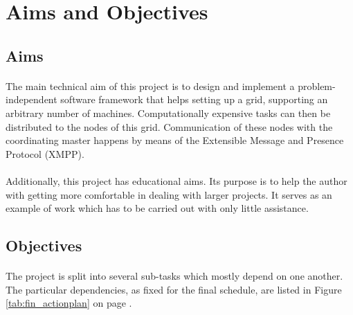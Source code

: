 \section{Aims and Objectives}

\subsection{Aims}
\paragraph{}
The main technical aim of this project is to design and implement a prob\-lem-in\-de\-pen\-dent software framework that helps setting up a grid, supporting an arbitrary number of machines. Computationally expensive tasks can then be distributed to the nodes of this grid. Communication of these nodes with the coordinating master happens by means of the Extensible Message and Presence Protocol (XMPP).
\paragraph{}
Additionally, this project has educational aims. Its purpose is to help the author with getting more comfortable in dealing with larger projects. It serves as an example of work which has to be carried out with only little assistance.

\subsection{Objectives}
\label{sec:objectives}
\paragraph{}
The project is split into several sub-tasks which mostly depend on one another. The particular dependencies, as fixed for the final schedule, are listed in Figure \ref{tab:fin_actionplan} on page \pageref{tab:fin_actionplan}.

